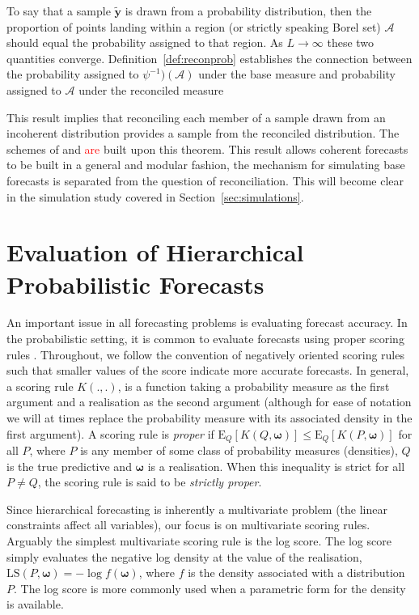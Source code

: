 \documentclass[a4paper,12pt]{article}
\def\E{\text{E}}
\theoremstyle{definition}
\begin{document}
{\color{red} To say that a sample $\tilde{\bm{y}}$ is drawn from a probability distribution, then the proportion of points landing within a region (or strictly speaking Borel set) $\mathcal{A}$ should equal the probability assigned to that region. As $L\rightarrow\infty$ these two quantities converge. Definition~\ref{def:reconprob} establishes the connection between the probability assigned to $\psi^{-1})(\mathcal{A})$ under the base measure and probability assigned to $\mathcal{A}$ under the reconciled measure}

This result implies that reconciling each member of a sample drawn from an incoherent distribution provides a sample from the reconciled distribution. The schemes of \cite{JeoEtAl2019} and \cite{RanEtAl2021} \textcolor{red}{are} built upon this theorem. This result allows coherent forecasts to be built in a general and modular fashion, the mechanism for simulating base forecasts is separated from the question of reconciliation. This will become clear in the simulation study covered in Section~\ref{sec:simulations}.


\section{Evaluation of Hierarchical Probabilistic Forecasts} \label{sec:evaluation}

An important issue in all forecasting problems is evaluating forecast accuracy. In the probabilistic setting, it is common to evaluate forecasts using proper scoring rules \citep[see][and references therein]{Gneiting2007,Gneiting2014}. Throughout, we follow the convention of negatively oriented scoring rules such that smaller values of the score indicate more accurate forecasts. In general, a scoring rule $K(.,.)$, is a function taking a probability measure as the first argument and a realisation as the second argument (although for ease of notation we will at times replace the probability measure with its associated density in the first argument). A scoring rule is \emph{proper} if $\E_{Q}[K(Q,\bm{\omega})] \le \E_{Q}[K(P,{\bm\omega})]$ for all $P$, where $P$ is any member of some class of probability measures (densities), $Q$ is the true predictive and $\bm{\omega}$ is a realisation. When this inequality is strict for all $P\neq Q$, the scoring rule is said to be \emph{strictly proper}.

Since hierarchical forecasting is inherently a multivariate problem (the linear constraints affect all variables), our focus is on multivariate scoring rules. Arguably the simplest multivariate scoring rule is the log score. The log score simply evaluates the negative log density at the value of the realisation, $\text{LS}(P,\bm\omega)=-\log f(\bm\omega)$, where $f$ is the density associated with a distribution $P$. The log score is more commonly used when a parametric form for the density is available.
\end{document}
